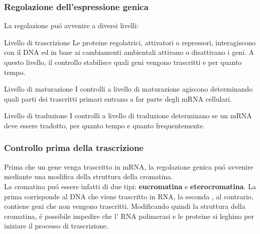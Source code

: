 \documentclass[hyperref={pdfpagelabels=false}]{beamer}
\begin{document}
\begin{frame}\frametitle{Regolazione dell'espressione genica}
La regolazione pu\'o avvenire a diversi livelli:
\begin{block}{Livello di trascrizione}
Le proteine regolatrici, attivatori o repressori, interagiscono con il DNA ed in base ai cambiamenti ambientali attivano o disattivano i geni. A questo livello, il controllo stabilisce quali geni vengono trascritti e per quanto tempo.
\end{block}
\begin{block}{Livello di maturazione}
I controlli a livello di maturazione agiscono determinando quali parti dei trascritti primari entrano a far parte degli mRNA cellulari.
\end{block}
\begin{block}{Livello di traduzione}
I controlli a livello di traduzione determinano se un mRNA deve essere tradotto, per quanto tempo e quanto frequentemente.
\end{block}
\end{frame}


\begin{frame}\frametitle{Controllo prima della trascrizione}
 Prima che un gene venga trascritto in mRNA, la regolazione genica pu\'o avvenire mediante una modifica della struttura della cromatina.\\
 La cromatina pu\'o essere infatti di due tipi: \textbf{eucromatina} e \textbf{eterocromatina}. La prima corrisponde al DNA che viene trascritto in RNA, la seconda , al contrario, contiene geni che non vengono trascritti.
 Modificando quindi la struttura della cromatina, \'e possibile impedire che l' RNA polimerasi e le proteine si leghino per iniziare il processo di trascrizione.
\end{frame}
\end{document}
